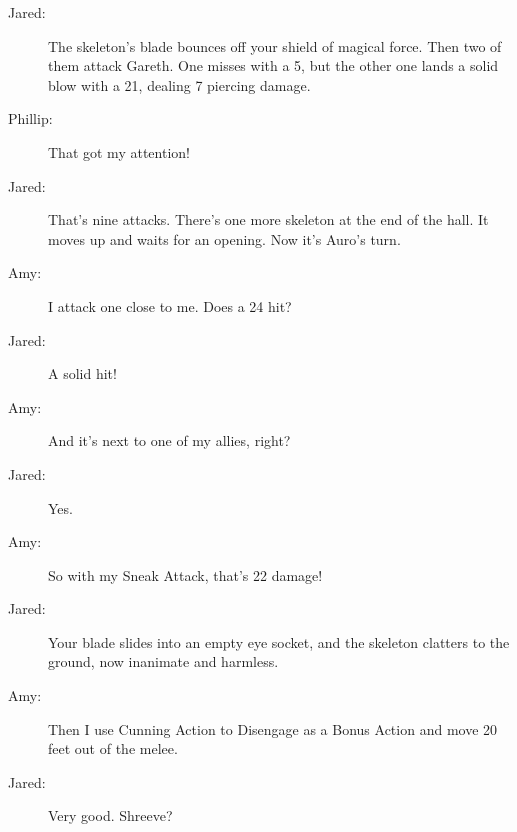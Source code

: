 \documentclass[10pt,a4paper,twoside,bg=print,twocolumn,openany,nodeprecatedcode]{dndbook}
\begin{document}
\begin{description}
\item[Jared:]
The skeleton's blade bounces off your shield of magical force. Then two of them attack Gareth. One misses with a 5, but the other one lands a solid blow with a 21, dealing 7 piercing damage.
\item[Phillip:]
That got my attention!
\item[Jared:]
That's nine attacks. There's one more skeleton at the end of the hall. It moves up and waits for an opening. Now it's Auro's turn.
\item[Amy:]
I attack one close to me. Does a 24 hit?
\item[Jared:]
A solid hit!
\item[Amy:]
And it's next to one of my allies, right?
\item[Jared:]
Yes.
\end{description}

{\par \vspace { 9pt plus 3pt minus 3pt } \noindent  {} \nopagebreak }

\begin{description}
\item[Amy:]
So with my Sneak Attack, that's 22 damage!
\end{description}


\begin{description}
\item[Jared:]
Your blade slides into an empty eye socket, and the skeleton clatters to the ground, now inanimate and harmless.
\end{description}

{\par \vspace { 9pt plus 3pt minus 3pt } \noindent  {} \nopagebreak }

\begin{description}
\item[Amy:]
Then I use Cunning Action to Disengage as a Bonus Action and move 20 feet out of the melee.
\end{description}


\begin{description}
\item[Jared:]
Very good. Shreeve?
\end{description}

{\par \vspace { 9pt plus 3pt minus 3pt } \noindent  {} \nopagebreak }
\end{document}
